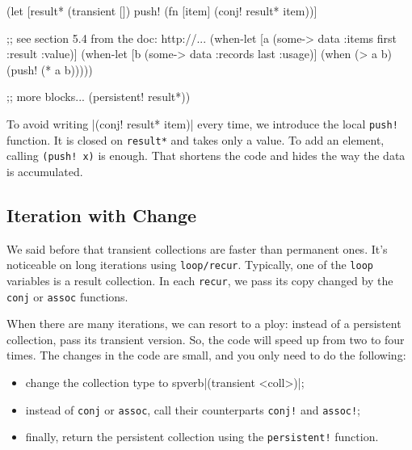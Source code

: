\else

\begin{clojure}
(let [result* (transient [])
      push! (fn [item]
              (conj! result* item))]

  ;; see section 5.4 from the doc: http://...
  (when-let [a (some-> data :items first :result :value)]
    (when-let [b (some-> data :records last :usage)]
      (when (> a b)
        (push! (* a b)))))

  ;; more blocks...
  (persistent! result*))
\end{clojure}

\fi


\mnoindent
To avoid writing \spverb|(conj! result* item)| every time, we introduce the local \verb|push!| function.
It is closed on \verb|result*| and takes only a value.
To add an element, calling \verb|(push! x)| is enough. That shortens the code and hides the way the data is accumulated.

\subsection{Iteration with Change}


We said before that transient collections are faster than permanent ones. It's noticeable on long iterations using \verb|loop/recur|.
Typically, one of the \verb|loop| variables is a result collection.
In each \verb|recur|, we pass its copy changed by the \verb|conj| or \verb|assoc| functions.

When there are many iterations, we can resort to a ploy: instead of a persistent collection, pass its transient version. So, the code will speed up from two to four times. The changes in the code are small, and you only need to do the following:

\begin{itemize}

\item
  change the collection type to spverb|(transient <coll>)|;

\item
  instead of \verb|conj| or \verb|assoc|, call their counterparts \verb|conj!| and \verb|assoc!|;

\item
  finally, return the persistent collection using the \verb|persistent!| function.

\end{itemize}

